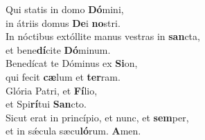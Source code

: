 \evenverse Qui statis in domo \textbf{Dó}mini,~\*\\
\evenverse in átriis domus \textbf{De}i \textbf{no}stri.\\
\oddverse In nóctibus extóllite manus vestras in \textbf{san}cta,~\*\\
\oddverse et bene\textbf{dí}cite \textbf{Dó}minum.\\
\evenverse Benedícat te Dóminus ex \textbf{Si}on,~\*\\
\evenverse qui fecit \textbf{cæ}lum et \textbf{ter}ram.\\
\oddverse Glória Patri, et \textbf{Fí}lio,~\*\\
\oddverse et Spi\textbf{rí}tui \textbf{San}cto.\\
\evenverse Sicut erat in princípio, et nunc, et \textbf{sem}per,~\*\\
\evenverse et in sǽcula sæcu\textbf{ló}rum. \textbf{A}men.\\
